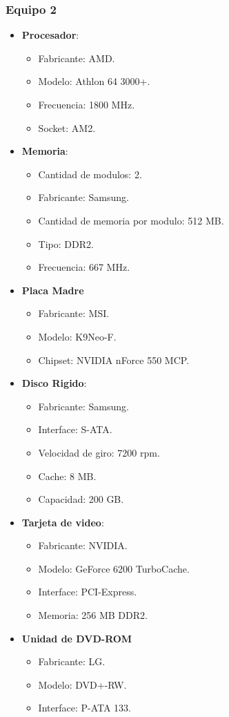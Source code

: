 \subsubsection{Equipo 2}
\begin{itemize}
\item \textbf{Procesador}:
	\begin{itemize}
	\item Fabricante: AMD.	
	\item Modelo: Athlon 64 3000+.
	\item Frecuencia: 1800 MHz.
	\item Socket: AM2.
	\end{itemize}
\item \textbf{Memoria}:
	\begin{itemize}
	\item Cantidad de modulos: 2.
	\item Fabricante: Samsung.
	\item Cantidad de memoria por modulo: 512 MB.
	\item Tipo: DDR2.
	\item Frecuencia: 667 MHz.
	\end{itemize}
\item \textbf{Placa Madre}
	\begin{itemize}
	\item Fabricante: MSI.	
	\item Modelo: K9Neo-F.
	\item Chipset: NVIDIA nForce 550 MCP.
	\end{itemize}
\item \textbf{Disco Rigido}:
	\begin{itemize}
	\item Fabricante: Samsung.	
	\item Interface: S-ATA.
	\item Velocidad de giro: 7200 rpm.
	\item Cache: 8 MB.
	\item Capacidad: 200 GB.
	\end{itemize}
\item \textbf{Tarjeta de video}:
	\begin{itemize}
	\item Fabricante: NVIDIA.
	\item Modelo: GeForce 6200 TurboCache.
	\item Interface: PCI-Express.
	\item Memoria: 256 MB DDR2.
	\end{itemize}
\item \textbf{Unidad de DVD-ROM}
	\begin{itemize}
	\item Fabricante: LG.
	\item Modelo: DVD+-RW.
	\item Interface: P-ATA 133.
	\end{itemize}
\end{itemize} 
